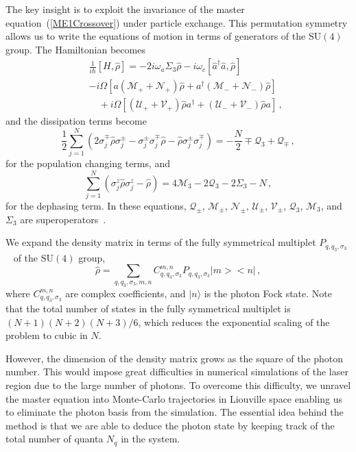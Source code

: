 \documentclass[aps,
twocolumn,
showpacs,
superscriptaddress,groupedaddress]{revtex4}
\begin{document}
The key insight is to exploit the invariance of the master
equation~(\ref{ME1Crossover}) under particle exchange.  This permutation
symmetry allows us to write the equations of motion in terms of
generators of the $\mathrm{SU}(4)$ group.  The Hamiltonian becomes
\begin{eqnarray}
  &&\frac{1}{i\hbar}[H,\hat{\rho}]=
  -2i \omega_a \Sigma_3\hat{\rho} -i\omega_c [ \hat{a}^{\dagger}\hat{a}, \hat{\rho}]
  \nonumber
  \\
  &&-i\Omega \left[a(\mathcal{M}_++\mathcal{N}_+)\hat{\rho}+a^\dagger
    (\mathcal{M}_-+\mathcal{N}_-)\hat{\rho}\right]\nonumber\\
  &&\quad{}+i\Omega\left[(\mathcal{U}_++\mathcal{V}_+)\hat{\rho} a^\dagger
    +(\mathcal{U}_-+\mathcal{V}_-)\hat{\rho} a\right]\,,
\end{eqnarray}
and the dissipation terms become
\begin{equation}
  \frac12\sum_{j=1}^N(
   2\sigma_j^{\mp}\hat{\rho}\sigma_j^{\pm}-\sigma_j^{\pm} \sigma_j^{\mp}\hat{\rho}-
   \hat{\rho} \sigma_j^{\pm}\sigma_j^{\mp}
  )=-\frac{N}{2}\mp
  \mathcal{Q}_3+\mathcal{Q}_{\mp}\,,
\end{equation}
for the population changing terms, and
\begin{equation}
\sum_{j=1}^N(\sigma_j^{z}\hat{\rho}\sigma_j^{z}-\hat{\rho})=4\mathcal{M}_3-2
  \mathcal{Q}_3-2\Sigma_3-N\,,
  \label{ham}
\end{equation}
for the dephasing term.  In these equations, $\mathcal{Q}_{\pm}$,
$\mathcal{M}_{\pm}$, $\mathcal{N}_{\pm}$, $\mathcal{U}_{\pm}$,
$\mathcal{V}_{\pm}$, $\mathcal{Q}_3$, $\mathcal{M}_3$, and $\Sigma_3$
are superoperators~\cite{PhysRevA.87.062101}.

We expand the density matrix in terms of the fully symmetrical multiplet
$P_{q,q_3,\sigma_3}$~\cite{PhysRevA.87.062101} of the $\mathrm{SU}(4)$ group,
\begin{equation}\label{ex}
  \hat{\rho}=\sum_{q,q_3,\sigma_3,m,n} C_{q,q_3,\sigma_3}^{m,n}
  P_{q,q_3,\sigma_3}\bigl|m\bigr>\bigl<n\bigr|\,,
\end{equation}
where $C_{q,q_3,\sigma_3}^{m,n}$ are complex coefficients, and
$|n\rangle$ is the photon Fock state. Note that the total number of
states in the fully symmetrical multiplet is $(N+1)(N+2)(N+3)/6$,
which reduces the exponential scaling of the problem to cubic in $N$.

However, the dimension of the density matrix grows as the square of the
photon number.  This would impose great difficulties in numerical
simulations of the laser region due to the large number of photons.  To
overcome this difficulty, we unravel the master equation into
Monte-Carlo trajectories in Liouville space enabling us to eliminate the
photon basis from the simulation.  The essential idea behind the method
is that we are able to deduce the photon state by keeping track of the
total number of quanta $N_q$ in the system.
\end{document}
